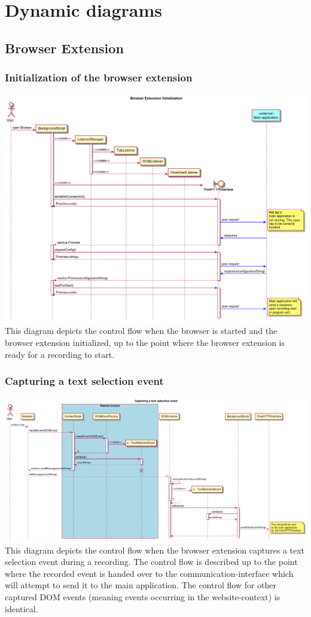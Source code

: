 \chapter{Dynamic diagrams}
\label{ch:dynamicdiagram}
\section{Browser Extension}
\subsection{Initialization of the browser extension}
\includegraphics[width=1.0\textwidth]{resources/DynamicDiagrams/InitBrowserEx.png}
This diagram depicts the control flow when the browser is started and the browser extension initialized, up to the point where the browser extension is ready for a recording to start.

\subsection{Capturing a text selection event}
\includegraphics[width=1.0\textwidth]{resources/DynamicDiagrams/CaptureEvent.png}
This diagram depicts the control flow when the browser extension captures a text selection event during a recording. The control flow is described up to the point where the recorded event is handed over to the communication-interface which will attempt to send it to the main application. The control flow for other captured DOM events (meaning events occurring in the website-context) is identical.